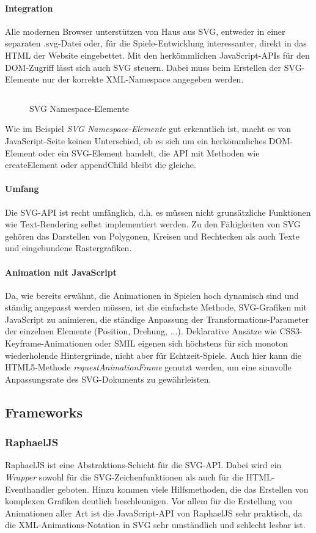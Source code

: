 \documentclass[a4paper, 12pt]{article}
\begin{document}
\paragraph{Integration} Alle modernen Browser unterstützen von Haus aus SVG, entweder in einer separaten .svg-Datei oder, für die Spiele-Entwicklung interessanter, direkt in das HTML der Website eingebettet. Mit den herkömmlichen JavaScript-APIs für den DOM-Zugriff lässt sich auch SVG steuern. Dabei muss beim Erstellen der SVG-Elemente nur der korrekte XML-Namespace angegeben werden.
\begin{figure}[h!]
	\inputminted{javascript}{assets/svg_example.js}
	\caption{SVG Namespace-Elemente}
	\label{svg_namespace_example}
\end{figure}
Wie im Beispiel \emph{SVG Namespace-Elemente} gut erkenntlich ist, macht es von JavaScript-Seite keinen Unterschied, ob es sich um ein herkömmliches DOM-Element oder ein SVG-Element handelt, die API mit Methoden wie createElement oder appendChild bleibt die gleiche.
\paragraph{Umfang} Die SVG-API ist recht umfänglich, d.h. es müssen nicht grunsätzliche Funktionen wie Text-Rendering selbst implementiert werden. Zu den Fähigkeiten von SVG gehören das Darstellen von Polygonen, Kreisen und Rechtecken als auch Texte und eingebundene Rastergrafiken.
\paragraph{Animation mit JavaScript} Da, wie bereits erwähnt, die Animationen in Spielen hoch dynamisch sind und ständig angepasst werden müssen, ist die einfachste Methode, SVG-Grafiken mit JavaScript zu animieren, die ständige Anpassung der Transformations-Parameter der einzelnen Elemente (Position, Drehung, ...). Deklarative Ansätze wie CSS3-Keyframe-Animationen oder SMIL eigenen sich höchstens für sich monoton wiederholende Hintergründe, nicht aber für Echtzeit-Spiele. Auch hier kann die HTML5-Methode \emph{requestAnimationFrame} genutzt werden, um eine sinnvolle Anpassungsrate des SVG-Dokuments zu gewährleisten.
\subsection{Frameworks}
\subsubsection{RaphaelJS}
RaphaelJS ist eine Abstraktions-Schicht für die SVG-API. Dabei wird ein \emph{Wrapper} sowohl für die SVG-Zeichenfunktionen als auch für die HTML-Eventhandler geboten. Hinzu kommen viele Hilfsmethoden, die das Erstellen von komplexen Grafiken deutlich beschleunigen. Vor allem für die Erstellung von Animationen aller Art ist die JavaScript-API von RaphaelJS sehr praktisch, da die XML-Animations-Notation in SVG sehr umständlich und schlecht lesbar ist.
\end{document}

